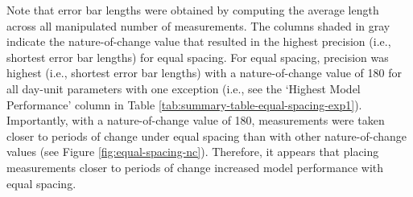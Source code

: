 \documentclass[
12pt, %
twoside,
english]{guelphthesis}
\begin{document}
Note that error bar lengths were obtained by computing the average length across all manipulated number of measurements. The columns shaded in gray indicate the nature-of-change value that resulted in the highest precision (i.e., shortest error bar lengths) for equal spacing. For equal spacing, precision was highest (i.e., shortest error bar lengths) with a nature-of-change value of 180 for all day-unit parameters with one exception (i.e., see the `Highest Model Performance' column in Table \ref{tab:summary-table-equal-spacing-exp1}). Importantly, with a nature-of-change value of 180, measurements were taken closer to periods of change under equal spacing than with other nature-of-change values (see Figure \ref{fig:equal-spacing-nc}). Therefore, it appears that placing measurements closer to periods of change increased model performance with equal spacing.
\end{document}
